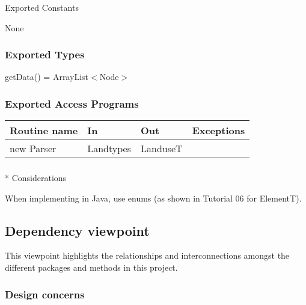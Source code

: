 \documentclass[12pt]{article}
\begin{document}
                \subsubsection*{} {Exported Constants}
                
                None
                
                \subsubsection* {Exported Types}
                
                getData() = ArrayList$<$Node$>$
                
                \subsubsection* {Exported Access Programs}
                
                
                \begin{tabular}{| l | l | l | p{5cm} |}
                \hline
                \textbf{Routine name} & \textbf{In} & \textbf{Out} & \textbf{Exceptions}\\
                \hline
                new Parser & Landtypes & LanduseT & ~\\
                \hline
                \end{tabular}
                
                \subsubsection{}* {Considerations}
                
                When implementing in Java, use enums (as shown in Tutorial 06 for ElementT).
                            
        \subsection{Dependency viewpoint}%
            This viewpoint highlights the relationships and interconnections amongst the different packages and methods in this project.
            
            \subsubsection{Design concerns}
            
\end{document}
